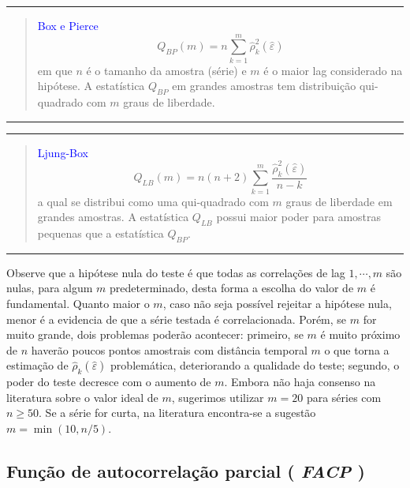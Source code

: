 \documentclass[
]{book}
\theoremstyle{definition}
\theoremstyle{definition}
\theoremstyle{definition}
\theoremstyle{remark}
\begin{document}
\begin{center}\rule{0.5\linewidth}{0.5pt}\end{center}

\begin{quote}
\textcolor{blue}{Box e Pierce}
\[
Q_{BP}(m)={n}\sum_{k=1}^{m}\hat{\rho}_k^2(\hat{\varepsilon})
\]
em que \(n\) é o tamanho da amostra (série) e \(m\) é o maior lag considerado na hipótese. A estatística \(Q_{BP}\) em grandes amostras tem distribuição qui-quadrado com \(m\) graus de liberdade.
\end{quote}

\begin{center}\rule{0.5\linewidth}{0.5pt}\end{center}

\begin{center}\rule{0.5\linewidth}{0.5pt}\end{center}

\begin{quote}
\textcolor{blue}{Ljung-Box}
\[
Q_{LB}(m)={n(n+2)}\sum_{k=1}^{m}\frac{\hat{\rho}_k^2(\hat{\varepsilon})}{n-k}
\]
a qual se distribui como uma qui-quadrado com \(m\) graus de liberdade em
grandes amostras. A estatística \(Q_{LB}\) possui maior poder para amostras
pequenas que a estatística \(Q_{BP}\).
\end{quote}

\begin{center}\rule{0.5\linewidth}{0.5pt}\end{center}

Observe que a hipótese nula do teste é que todas as correlações de lag \(1,\cdots,m\) são nulas, para algum \(m\) predeterminado, desta forma a escolha do valor de \(m\) é fundamental. Quanto maior o \(m\), caso não seja possível rejeitar a hipótese nula, menor é a evidencia de que a série testada é correlacionada. Porém, se \(m\) for muito grande, dois problemas poderão acontecer: primeiro, se \(m\) é muito próximo de \(n\) haverão poucos pontos amostrais com distância temporal \(m\) o que torna a estimação de \(\hat\rho_k(\hat\varepsilon)\) problemática, deteriorando a qualidade do teste; segundo, o poder do teste decresce com o aumento de \(m\). Embora não haja consenso na literatura sobre o valor ideal de \(m\), sugerimos utilizar \(m=20\) para séries com \(n\geq50\). Se a série for curta, na literatura encontra-se a sugestão \(m=\min(10,n/5)\).

\hypertarget{funuxe7uxe3o-de-autocorrelauxe7uxe3o-parcial-facp}{%
\subsection{\texorpdfstring{Função de autocorrelação parcial ( \emph{FACP} )}{Função de autocorrelação parcial ( FACP )}}\label{funuxe7uxe3o-de-autocorrelauxe7uxe3o-parcial-facp}}
\end{document}
